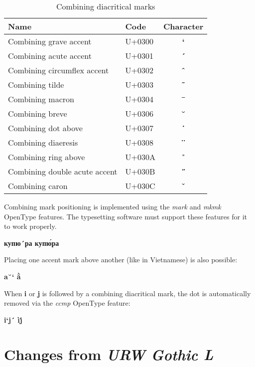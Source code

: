 \documentclass[a4paper,12pt,oneside,extrafontsizes]{memoir}
\begin{document}
\begin{table}[htbp]
	\caption{Combining diacritical marks}
	\label{tab:combmarks}
	\notexfont
	\begin{tabularx}{\textwidth}{Xlc}
		\toprule
		\textbf{Name} & \textbf{Code} & \textbf{Character} \\
		\midrule
		Combining grave accent & U+0300 & \textbf{`}\\
		Combining acute accent & U+0301 & \textbf{´}\\
		Combining circumflex accent & U+0302 & \textbf{ˆ}\\
		Combining tilde & U+0303 & \textbf{˜}\\
		Combining macron & U+0304 & \textbf{¯}\\
		Combining breve & U+0306 & \textbf{˘}\\
		Combining dot above & U+0307 & \textbf{˙}\\
		Combining diaeresis & U+0308 & \textbf{¨}\\
		Combining ring above & U+030A & \textbf{˚}\\
		Combining double acute accent & U+030B & \textbf{˝}\\
		Combining caron & U+030C & \textbf{ˇ}\\
		\bottomrule
	\end{tabularx}
\end{table}

Combining mark positioning is implemented using the \emph{mark} and \emph{mkmk} OpenType features. The typesetting software must support these features for it to work properly.

\begin{center}
\bfseries\Huge
купю´ра \djvuarrow купю́ра
\end{center}

Placing one accent mark above another (like in Vietnamese) is also possible:

\begin{center}
\bfseries\Huge\notexfont
a˘` \djvuarrow ằ
\end{center}

When \textbf{i} or \textbf{j} is followed by a combining diacritical mark, the dot is automatically removed via the \emph{ccmp} OpenType feature:

\begin{center}
\bfseries\Huge\notexfont
i`j´ \djvuarrow ìj́
\end{center}

\chapter{Changes from \emph{URW Gothic L}}
\end{document}
